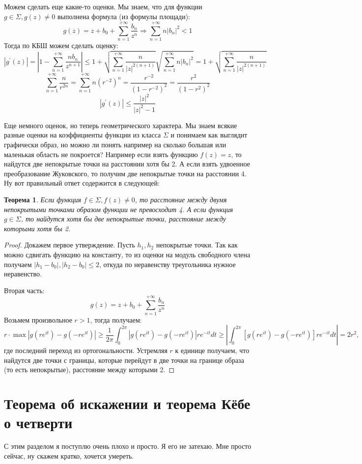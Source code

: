 \documentclass[12pt,a4paper]{article} %
\newtheorem{theorem}{Теорема}
\begin{document}
	Можем сделать еще какие-то оценки. Мы знаем, что для функции $g\in\Sigma, g(z)\neq0$ выполнена формула (из формулы площади):
	$$g(z)=z+b_0+\sum_{n=1}^{+\infty}\frac{b_n}{z^n}\Rightarrow\sum_{n=1}^{+\infty}n|b_n|^2<1$$
	Тогда по КБШ можем сделать оценку:
	$$|g^{'}(z)|=\left|1-\sum_{n=1}^{+\infty}\frac{nb_n}{z^{n+1}}\right|\leq1+\sqrt{\sum_{n=1}^{+\infty}\frac{n}{|z|^{2(n+1)}}}\sqrt{\sum_{n=1}^{+\infty}n|b_n|^2}=1+\sqrt{\sum_{n=1}^{+\infty}\frac{n}{|z|^{2(n+1)}}}$$
	$$\sum_{n=1}^{+\infty}\frac{n}{r^{2n}}=\sum_{n=1}^{+\infty}n(r^{-2})^n=\frac{r^{-2}}{(1-r^{-2})^2}=\frac{r^2}{(1-r^2)^2}$$
	$$|g^{'}(z)|\leq\frac{|z|^2}{|z|^2-1}$$
	
	Еще немного оценок, но теперь геометрического характера. Мы знаем всякие разные оценки на коэффициенты функции из класса $\Sigma$ и понимаем как выглядит графически образ, но можно ли понять например на сколько большая или маленькая область не покроется? Например если взять функцию $f(z)=z$, то найдутся две непокрытые точки на расстоянии хотя бы 2. А если взять удвоенное преобразование Жуковского, то получим две непокрытые точки на расстоянии 4. Ну вот правильный ответ содержится в следующей:
	\begin{theorem}
		Если функция $f\in\Sigma,f(z)\neq0$, то расстояние между двумя непокрытыми точками образом функции не превосходит 4. А если функция $g\in\Sigma$, то найдутся хотя бы две непокрытые точки, расстояние между которыми хотя бы 2.
	\end{theorem}
	\begin{proof}
		Докажем первое утверждение. Пусть $h_1,h_2$ непокрытые точки. Так как можно сдвигать функцию на константу, то из оценки на модуль свободного члена получаем $|h_1-b_0|,|h_2-b_0|\leq2$, откуда по неравенству треугольника нужное неравенство.
		
		Вторая часть:
		$$g(z)=z+b_0+\sum_{n=1}^{+\infty}\frac{b_n}{z^n}$$
		Возьмем произвольное $r>1$, тогда получаем:
		$$r\cdot\max|g(re^{it})-g(-re^{it})|\geq\frac{1}{2\pi}\int_0^{2\pi}|g(re^{it})-g(-re^{it})|re^{-it}dt\geq\left|\int_0^{2\pi}[g(re^{it})-g(-re^{it})]re^{-it}dt\right|=2r^2,$$
		где последний переход из ортогональности. Устремляя $r$ к единице получаем, что найдутся две точки с границы, которые перейдут в две точки на границе образа (то есть непокрытые), расстояние между которыми 2.
	\end{proof}
	\section{Теорема об искажении и теорема Кёбе о четверти}
	С этим разделом я поступлю очень плохо и просто. Я его не затехаю. Мне просто сейчас, ну скажем кратко, хочется умереть.
	
\end{document}
